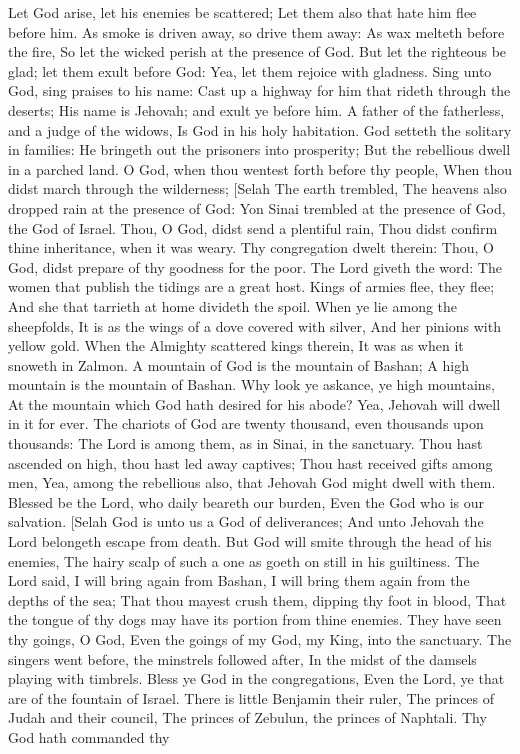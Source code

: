 Let God arise, let his enemies be scattered; Let them also that hate him flee before him.  As smoke is driven away, so drive them away: As wax melteth before the fire, So let the wicked perish at the presence of God.  But let the righteous be glad; let them exult before God: Yea, let them rejoice with gladness.  Sing unto God, sing praises to his name: Cast up a highway for him that rideth through the deserts; His name is Jehovah; and exult ye before him.  A father of the fatherless, and a judge of the widows, Is God in his holy habitation.  God setteth the solitary in families: He bringeth out the prisoners into prosperity; But the rebellious dwell in a parched land.  O God, when thou wentest forth before thy people, When thou didst march through the wilderness; [Selah  The earth trembled, The heavens also dropped rain at the presence of God: Yon Sinai trembled at the presence of God, the God of Israel.  Thou, O God, didst send a plentiful rain, Thou didst confirm thine inheritance, when it was weary.  Thy congregation dwelt therein: Thou, O God, didst prepare of thy goodness for the poor.  The Lord giveth the word: The women that publish the tidings are a great host.  Kings of armies flee, they flee; And she that tarrieth at home divideth the spoil.  When ye lie among the sheepfolds, It is as the wings of a dove covered with silver, And her pinions with yellow gold.  When the Almighty scattered kings therein, It was as when it snoweth in Zalmon.  A mountain of God is the mountain of Bashan; A high mountain is the mountain of Bashan.  Why look ye askance, ye high mountains, At the mountain which God hath desired for his abode? Yea, Jehovah will dwell in it for ever.  The chariots of God are twenty thousand, even thousands upon thousands: The Lord is among them, as in Sinai, in the sanctuary.  Thou hast ascended on high, thou hast led away captives; Thou hast received gifts among men, Yea, among the rebellious also, that Jehovah God might dwell with them.  Blessed be the Lord, who daily beareth our burden, Even the God who is our salvation. [Selah  God is unto us a God of deliverances; And unto Jehovah the Lord belongeth escape from death.  But God will smite through the head of his enemies, The hairy scalp of such a one as goeth on still in his guiltiness.  The Lord said, I will bring again from Bashan, I will bring them again from the depths of the sea;  That thou mayest crush them, dipping thy foot in blood, That the tongue of thy dogs may have its portion from thine enemies.  They have seen thy goings, O God, Even the goings of my God, my King, into the sanctuary.  The singers went before, the minstrels followed after, In the midst of the damsels playing with timbrels.  Bless ye God in the congregations, Even the Lord, ye that are of the fountain of Israel.  There is little Benjamin their ruler, The princes of Judah and their council, The princes of Zebulun, the princes of Naphtali.  Thy God hath commanded thy 